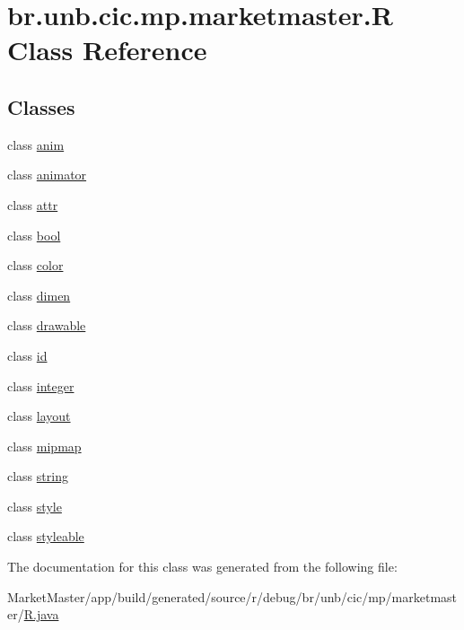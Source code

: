 \hypertarget{classbr_1_1unb_1_1cic_1_1mp_1_1marketmaster_1_1R}{}\section{br.\+unb.\+cic.\+mp.\+marketmaster.\+R Class Reference}
\label{classbr_1_1unb_1_1cic_1_1mp_1_1marketmaster_1_1R}
\subsection*{Classes}
\begin{DoxyCompactItemize}
\item 
class \mbox{\hyperlink{classbr_1_1unb_1_1cic_1_1mp_1_1marketmaster_1_1R_1_1anim}{anim}}
\item 
class \mbox{\hyperlink{classbr_1_1unb_1_1cic_1_1mp_1_1marketmaster_1_1R_1_1animator}{animator}}
\item 
class \mbox{\hyperlink{classbr_1_1unb_1_1cic_1_1mp_1_1marketmaster_1_1R_1_1attr}{attr}}
\item 
class \mbox{\hyperlink{classbr_1_1unb_1_1cic_1_1mp_1_1marketmaster_1_1R_1_1bool}{bool}}
\item 
class \mbox{\hyperlink{classbr_1_1unb_1_1cic_1_1mp_1_1marketmaster_1_1R_1_1color}{color}}
\item 
class \mbox{\hyperlink{classbr_1_1unb_1_1cic_1_1mp_1_1marketmaster_1_1R_1_1dimen}{dimen}}
\item 
class \mbox{\hyperlink{classbr_1_1unb_1_1cic_1_1mp_1_1marketmaster_1_1R_1_1drawable}{drawable}}
\item 
class \mbox{\hyperlink{classbr_1_1unb_1_1cic_1_1mp_1_1marketmaster_1_1R_1_1id}{id}}
\item 
class \mbox{\hyperlink{classbr_1_1unb_1_1cic_1_1mp_1_1marketmaster_1_1R_1_1integer}{integer}}
\item 
class \mbox{\hyperlink{classbr_1_1unb_1_1cic_1_1mp_1_1marketmaster_1_1R_1_1layout}{layout}}
\item 
class \mbox{\hyperlink{classbr_1_1unb_1_1cic_1_1mp_1_1marketmaster_1_1R_1_1mipmap}{mipmap}}
\item 
class \mbox{\hyperlink{classbr_1_1unb_1_1cic_1_1mp_1_1marketmaster_1_1R_1_1string}{string}}
\item 
class \mbox{\hyperlink{classbr_1_1unb_1_1cic_1_1mp_1_1marketmaster_1_1R_1_1style}{style}}
\item 
class \mbox{\hyperlink{classbr_1_1unb_1_1cic_1_1mp_1_1marketmaster_1_1R_1_1styleable}{styleable}}
\end{DoxyCompactItemize}


The documentation for this class was generated from the following file\+:\begin{DoxyCompactItemize}
\item 
Market\+Master/app/build/generated/source/r/debug/br/unb/cic/mp/marketmaster/\mbox{\hyperlink{debug_2br_2unb_2cic_2mp_2marketmaster_2R_8java}{R.\+java}}\end{DoxyCompactItemize}

